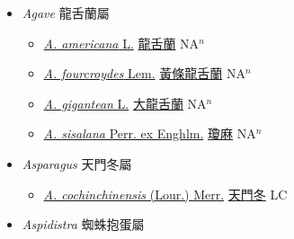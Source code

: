 
  \begin{itemize}
 \item[] \textit{Agave} 龍舌蘭屬
                    
  \begin{itemize}
        \item[] \href{http://www.theplantlist.org/tpl1.1/search?q=Agave+americana}{\textit{A. americana} L.}   \href{\detokenize{http://taibnet.sinica.edu.tw/chi/taibnet_species_list.php?T2=龍舌蘭&T2_new_value=true&fr=y}}{龍舌蘭} NA$^n$
        \item[] \href{http://www.theplantlist.org/tpl1.1/search?q=Agave+fourcroydes}{\textit{A. fourcroydes} Lem.}   \href{\detokenize{http://taibnet.sinica.edu.tw/chi/taibnet_species_list.php?T2=黃條龍舌蘭&T2_new_value=true&fr=y}}{黃條龍舌蘭} NA$^n$
        \item[] \href{http://www.theplantlist.org/tpl1.1/search?q=Agave+gigantean}{\textit{A. gigantean} L.}   \href{\detokenize{http://taibnet.sinica.edu.tw/chi/taibnet_species_list.php?T2=大龍舌蘭&T2_new_value=true&fr=y}}{大龍舌蘭} NA$^n$
        \item[] \href{http://www.theplantlist.org/tpl1.1/search?q=Agave+sisalana}{\textit{A. sisalana} Perr. ex Enghlm.}   \href{\detokenize{http://taibnet.sinica.edu.tw/chi/taibnet_species_list.php?T2=瓊麻&T2_new_value=true&fr=y}}{瓊麻} NA$^n$
  \end{itemize}
 \item[] \textit{Asparagus} 天門冬屬
                    
  \begin{itemize}
        \item[] \href{http://www.theplantlist.org/tpl1.1/search?q=Asparagus+cochinchinensis}{\textit{A. cochinchinensis} (Lour.) Merr.}   \href{\detokenize{http://taibnet.sinica.edu.tw/chi/taibnet_species_list.php?T2=天門冬&T2_new_value=true&fr=y}}{天門冬} LC
  \end{itemize}
 \item[] \textit{Aspidistra} 蜘蛛抱蛋屬
                    

\end{itemize}
